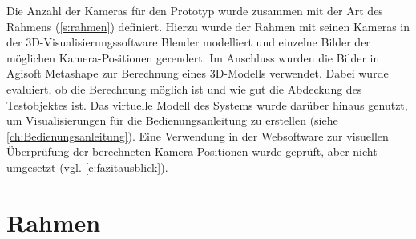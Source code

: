 \documentclass[./00PhotoBox.tex]{subfiles}
\begin{document}
Die Anzahl der Kameras für den Prototyp wurde zusammen mit der Art des Rahmens (\autoref{s:rahmen}) definiert. Hierzu wurde der Rahmen mit seinen Kameras in der 3D-Visualisierungssoftware Blender modelliert und einzelne Bilder der möglichen Kamera-Positionen gerendert. Im Anschluss wurden die Bilder in Agisoft Metashape zur Berechnung eines 3D-Modells verwendet. Dabei wurde evaluiert, ob die Berechnung möglich ist und wie gut die Abdeckung des Testobjektes ist. Das virtuelle Modell des Systems wurde darüber hinaus genutzt, um Visualisierungen für die Bedienungsanleitung zu erstellen (siehe \autoref{ch:Bedienungsanleitung}). Eine Verwendung in der Websoftware zur visuellen Überprüfung der berechneten Kamera-Positionen wurde geprüft, aber nicht umgesetzt (vgl. \autoref{c:fazitausblick}).

\section{Rahmen}
\label{s:rahmen}
\end{document}
